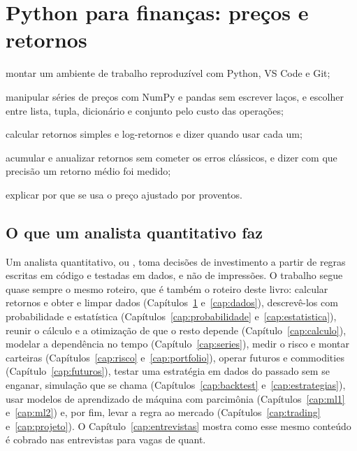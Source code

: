 \chapter{Python para finanças: preços e retornos}
\label{cap:retornos}


\begin{objetivos}
  \item montar um ambiente de trabalho reproduzível com Python, VS Code e Git;
  \item manipular séries de preços com NumPy e pandas sem escrever laços, e escolher entre lista, tupla, dicionário e conjunto pelo custo das operações;
  \item calcular retornos simples e log-retornos e dizer quando usar cada um;
  \item acumular e anualizar retornos sem cometer os erros clássicos, e dizer com que precisão um retorno médio foi medido;
  \item explicar por que se usa o preço ajustado por proventos.
\end{objetivos}

\section{O que um analista quantitativo faz}

Um analista quantitativo, ou , toma decisões de investimento a partir de regras escritas em código e testadas em dados, e não de impressões. O trabalho segue quase sempre o mesmo roteiro, que é também o roteiro deste livro: calcular retornos e obter e limpar dados (Capítulos~\ref{cap:retornos} e~\ref{cap:dados}), descrevê-los com probabilidade e estatística (Capítulos~\ref{cap:probabilidade} e~\ref{cap:estatistica}), reunir o cálculo e a otimização de que o resto depende (Capítulo~\ref{cap:calculo}), modelar a dependência no tempo (Capítulo~\ref{cap:series}), medir o risco e montar carteiras (Capítulos~\ref{cap:risco} e~\ref{cap:portfolio}), operar futuros e commodities (Capítulo~\ref{cap:futuros}), testar uma estratégia em dados do passado sem se enganar, simulação que se chama  (Capítulos~\ref{cap:backtest} e~\ref{cap:estrategias}), usar modelos de aprendizado de máquina com parcimônia (Capítulos~\ref{cap:ml1} e~\ref{cap:ml2}) e, por fim, levar a regra ao mercado (Capítulos~\ref{cap:trading} e~\ref{cap:projeto}). O Capítulo~\ref{cap:entrevistas} mostra como esse mesmo conteúdo é cobrado nas entrevistas para vagas de quant.

